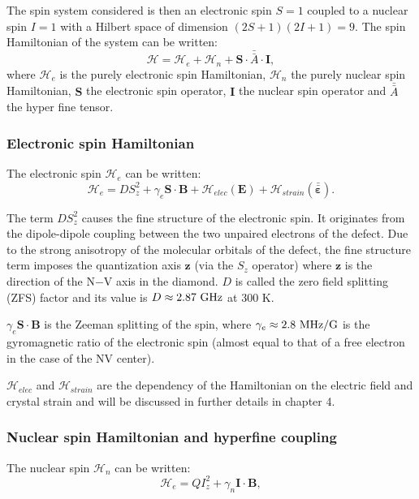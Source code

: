 \documentclass[a4paper,11pt]{report}
\begin{document}
The spin system considered is then an electronic spin $S=1$ coupled to a nuclear spin $I=1$ with a Hilbert space of dimension $(2S+1)(2I+1)=9$. The spin Hamiltonian of the system can be written:
\begin{equation}
\mathcal{H}=\mathcal{H}_e + \mathcal{H}_n + \mathbf{S}\cdot \bar{\bar{A}}\cdot \mathbf{I},
\end{equation}
where $\mathcal{H}_e$ is the purely electronic spin Hamiltonian, $\mathcal{H}_n$ the purely nuclear spin Hamiltonian, $\mathbf{S}$ the electronic spin operator, $\mathbf{I}$ the nuclear spin operator and $\bar{\bar{A}}$ the hyper fine tensor.
\subsubsection{Electronic spin Hamiltonian}
The electronic spin $\mathcal{H}_e$ can be written:
\begin{equation}
\label{eq. spin elec}
\mathcal{H}_e=D S_z^2 + \gamma_e \mathbf{S} \cdot \mathbf{B} + \mathcal{H}_{elec}(\mathbf{E})+ \mathcal{H}_{strain}(\mathbf{\bar{\bar{\varepsilon}}}).
\end{equation}

The term $D S_z^2$ causes the fine structure of the electronic spin. It originates from the dipole-dipole coupling between the two unpaired electrons of the defect. Due to the strong anisotropy of the molecular orbitals of the defect, the fine structure term imposes the quantization axis $\mathbf{z}$ (via the $S_z$ operator) where $\mathbf{z}$ is the direction of the N$-$V axis in the diamond. $D$ is called the zero field splitting (ZFS) factor and its value is $D\approx 2.87\ \rm GHz$ at 300 K.

$\gamma_e \mathbf{S} \cdot \mathbf{B}$ is the Zeeman splitting of the spin, where $\gamma_e \approx 2.8\ \rm MHz/G$ is the gyromagnetic ratio of the electronic spin (almost equal to that of a free electron in the case of the NV center).

$\mathcal{H}_{elec}$ and $\mathcal{H}_{strain}$ are the dependency of the Hamiltonian on the electric field and crystal strain and will be discussed in further details in chapter 4.

\subsubsection{Nuclear spin Hamiltonian and hyperfine coupling}
The nuclear spin $\mathcal{H}_n$ can be written:
\begin{equation}
\mathcal{H}_e=Q I_z^2 + \gamma_n \mathbf{I} \cdot \mathbf{B},
\end{equation}
\end{document}
